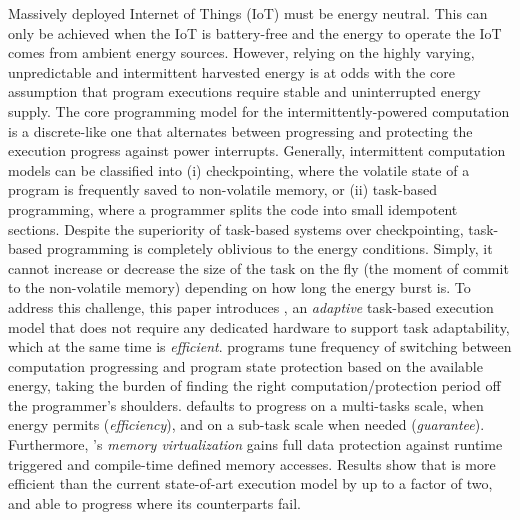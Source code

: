Massively deployed Internet of Things (IoT) must be energy neutral. This can only be achieved when the IoT is battery-free and the energy to operate the IoT comes from ambient energy sources.
However, relying on the highly varying, unpredictable and intermittent harvested energy is at odds with the core assumption that program executions require stable and uninterrupted energy supply. 
The core programming model for the intermittently-powered computation is a discrete-like one that alternates between progressing and protecting the execution progress against power interrupts.
Generally, intermittent computation models can be classified into (i) checkpointing, where the volatile state of a program is frequently saved to non-volatile memory, or (ii) task-based programming, where a programmer splits the code into small idempotent sections. Despite the superiority of task-based systems over checkpointing, task-based programming is completely oblivious to the energy conditions. Simply, it cannot increase or decrease the size of the task on the fly (the moment of commit to the non-volatile memory) depending on how long the energy burst is. 
To address this challenge, this paper introduces \sys, an \emph{adaptive} task-based execution model that does not require any dedicated hardware to support task adaptability, which at the same time is \emph{efficient}.
\sys programs tune frequency of switching between computation progressing and program state protection based on the available energy, taking the burden of finding the right computation/protection period off the programmer's shoulders.
\sys defaults to progress on a multi-tasks scale, when energy permits (\emph{efficiency}), and on a sub-task scale when needed (\emph{guarantee}). Furthermore, \sys's \emph{memory virtualization} gains \sys full data protection against runtime triggered and compile-time defined memory accesses. 
Results show that \sys is more efficient than the current state-of-art execution model by up to a factor of two, and able to progress where its counterparts fail.

